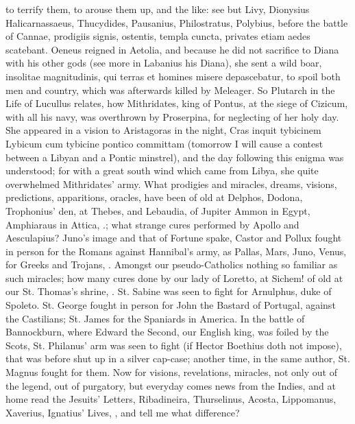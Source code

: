 {to terrify them, to arouse them up, and the like: see but Livy,
Dionysius Halicarnassaeus, Thucydides, Pausanius, Philostratus,
Polybius, before the battle of Cannae, prodigiis signis,
ostentis, templa cuncta, privates etiam aedes scatebant. Oeneus reigned
in Aetolia, and because he did not sacrifice to Diana with his other
gods (see more in Labanius his Diana), she sent a wild boar, insolitae
magnitudinis, qui terras et homines misere depascebatur, to spoil both
men and country, which was afterwards killed by Meleager. So Plutarch
in the Life of Lucullus relates, how Mithridates, king of Pontus, at
the siege of Cizicum, with all his navy, was overthrown by Proserpina,
for neglecting of her holy day. She appeared in a vision to Aristagoras
in the night, Cras inquit tybicinem Lybicum cum tybicine pontico
committam (tomorrow I will cause a contest between a Libyan and a
Pontic minstrel), and the day following this enigma was understood; for
with a great south wind which came from Libya, she quite overwhelmed
Mithridates' army. What prodigies and miracles, dreams, visions,
predictions, apparitions, oracles, have been of old at Delphos, Dodona,
Trophonius' den, at Thebes, and Lebaudia, of Jupiter Ammon in Egypt,
Amphiaraus in Attica, \etc{}.; what strange cures performed by Apollo and
Aesculapius? Juno's image and that of Fortune spake, Castor
and Pollux fought in person for the Romans against Hannibal's army, as
Pallas, Mars, Juno, Venus, for Greeks and Trojans, \etc{}. Amongst our
pseudo-Catholics nothing so familiar as such miracles; how many cures
done by our lady of Loretto, at Sichem! of old at our St. Thomas's
shrine, \etc{}. St. Sabine was seen to fight for Arnulphus, duke of
Spoleto. St. George fought in person for John the Bastard of
Portugal, against the Castilians; St. James for the Spaniards in
America. In the battle of Bannockburn, where Edward the Second, our
English king, was foiled by the Scots, St. Philanus' arm was seen to
fight (if Hector Boethius doth not impose), that was before shut
up in a silver cap-case; another time, in the same author, St. Magnus
fought for them. Now for visions, revelations, miracles, not only out
of the legend, out of purgatory, but everyday comes news from the
Indies, and at home read the Jesuits' Letters, Ribadineira,
Thurselinus, Acosta, Lippomanus, Xaverius, Ignatius' Lives, \etc{}, and
tell me what difference?

}

